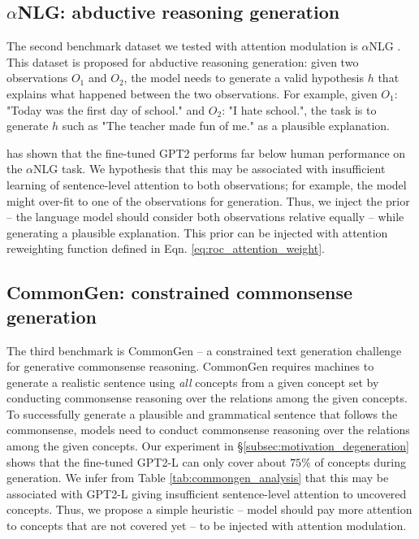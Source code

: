 \documentclass[11pt,a4paper]{article}
\newcommand{\alg}{attention modulation}
\begin{document}
\subsection{$\alpha$NLG: abductive reasoning generation}\label{subsec:mdoel_anlg_reweight}
The second benchmark dataset we tested with \alg{} is $\alpha$NLG \citep{bhagavatula2020abductive}. This dataset is proposed for abductive reasoning generation: given two observations $O_1$ and $O_2$, the model needs to generate a valid hypothesis $h$ that explains what happened between the two observations. For example, given $O_1$: "Today was the first day of school." and $O_2$: "I hate school.", the task is to generate $h$ such as "The teacher made fun of me." as a plausible explanation.

\citet{bhagavatula2020abductive} has shown that the fine-tuned GPT2 performs far below human performance on the $\alpha$NLG task. We hypothesis that this may be associated with insufficient learning of sentence-level attention to both observations; for example, the model might over-fit to one of the observations for generation. Thus, we inject the prior -- the language model should consider both observations relative equally -- while generating a plausible explanation. This prior can be injected with attention reweighting function defined in Eqn.  \ref{eq:roc_attention_weight}. 

\subsection{CommonGen: constrained commonsense generation}\label{subsec:mdoel_commongen_reweight}
The third benchmark is CommonGen -- a constrained text generation challenge for generative commonsense reasoning. CommonGen requires machines to generate a realistic sentence using \textit{all} concepts from a given concept set by conducting commonsense reasoning over the relations among the given concepts. To successfully generate a plausible and grammatical sentence that follows the commonsense, models need to conduct commonsense reasoning over the relations among the given concepts. 
Our experiment in \S \ref{subsec:motivation_degeneration} shows that the fine-tuned GPT2-L can only cover about $75\%$ of concepts during generation. We infer from Table \ref{tab:commongen_analysis} that this may be associated with GPT2-L giving insufficient sentence-level attention to uncovered concepts. Thus, we propose a simple heuristic -- model should pay more attention to concepts that are not covered yet -- to be injected with \alg{}.
\end{document}
